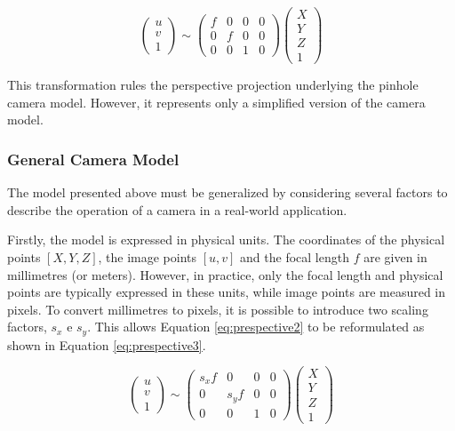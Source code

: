 \begin{equation} 
  \label{eq:prespective2}
  \begin{pmatrix}
  u \\ 
  v \\ 
  1
  \end{pmatrix}
  \sim
  \begin{pmatrix}
  f & 0 & 0 & 0 \\ 
  0 & f & 0 & 0 \\ 
  0 & 0 & 1 & 0
  \end{pmatrix}
  \begin{pmatrix}
  X \\ 
  Y \\ 
  Z \\ 
  1
  \end{pmatrix}
\end{equation}

This transformation rules the perspective projection underlying the pinhole camera model. However, it represents only a simplified version of the camera model.

\subsubsection{General Camera Model}

The model presented above must be generalized by considering several factors to describe the operation of a camera in a real-world application.

Firstly, the model is expressed in physical units. The coordinates of the physical points $[X, Y, Z]$, the image points $[u, v]$ and the focal length $f$ are given in millimetres (or meters).
However, in practice, only the focal length and physical points are typically expressed in these units, while image points are measured in pixels.
To convert millimetres to pixels, it is possible to introduce two scaling factors, $s_x$ e $s_y$. This allows Equation \ref{eq:prespective2}  to be reformulated as shown in Equation \ref{eq:prespective3}.

\begin{equation} 
  \label{eq:prespective3}
  \begin{pmatrix}
  u \\ 
  v \\ 
  1
  \end{pmatrix}
  \sim
  \begin{pmatrix}
  s_x f & 0 & 0 & 0 \\ 
  0 & s_y f & 0 & 0 \\ 
  0 & 0 & 1 & 0
  \end{pmatrix}
  \begin{pmatrix}
  X \\ 
  Y \\ 
  Z \\ 
  1
  \end{pmatrix}
\end{equation}

